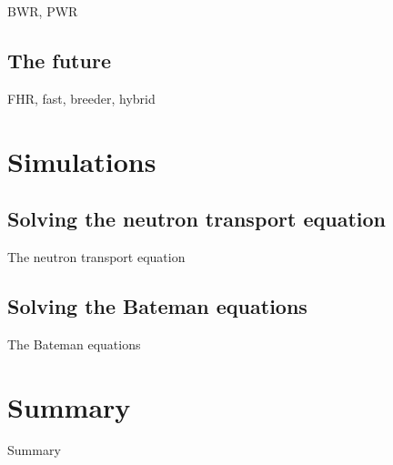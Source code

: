 \documentclass{beamer}
\begin{document}
    \begin{frame}{BWR, PWR}
    \end{frame}

\subsection{The future}

    \begin{frame}{FHR, fast, breeder, hybrid}
    \end{frame}

\section{Simulations}

\subsection{Solving the neutron transport equation}

    \begin{frame}{The neutron transport equation}
    \end{frame}

\subsection{Solving the Bateman equations}

    \begin{frame}{The Bateman equations}
    \end{frame}

\section*{Summary}

    \begin{frame}{Summary}

    \end{frame}
\end{document}
